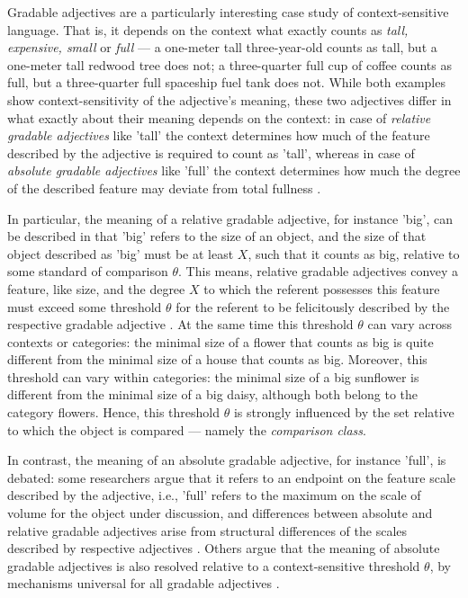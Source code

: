 Gradable adjectives are a particularly interesting case study of context-sensitive language. That is, it depends on the context what exactly counts as \textit{tall, expensive, small} or \textit{full} --- a one-meter tall three-year-old counts as tall, but a one-meter tall redwood tree does not; a three-quarter full cup of coffee counts as full, but a three-quarter full spaceship fuel tank does not. While both examples show context-sensitivity of the adjective's meaning, these two adjectives differ in what exactly about their meaning depends on the context: in case of \textit{relative gradable adjectives} like 'tall' the context determines how much of the feature described by the adjective is required to count as 'tall', whereas in case of \textit{absolute gradable adjectives} like 'full' the context determines how much the degree of the described feature may deviate from total fullness \parencite{Aparicio2016, Kennedy2007, hofherr2010adjectives}.  

In particular, the meaning of a relative gradable adjective, for instance 'big', can be described in that 'big' refers to the size of an object, and the size of that object  described as 'big' must be at least $X$, such that it counts as big, relative to some standard of comparison $\theta$. This means, relative gradable adjectives convey a feature, like size, and the degree $X$ to which the referent possesses this feature must exceed some threshold $\theta$ for the referent to be felicitously described by the respective gradable adjective \parencite[e.g.,][]{Kennedy2007}. At the same time this threshold $\theta$ can vary across contexts or categories: the minimal size of a flower that counts as big is quite different from the minimal size of a house that counts as big. Moreover, this threshold can vary within categories: the minimal size of a big sunflower is different from the minimal size of a big daisy, although both belong to the category flowers. Hence, this threshold $\theta$ is strongly influenced by the set relative to which the object is compared --- namely the \textit{comparison class}.

In contrast, the meaning of an absolute gradable adjective, for instance 'full', is debated: some researchers argue that it refers to an endpoint on the feature scale described by the adjective, i.e., 'full' refers to the maximum on the scale of volume for the object under discussion, and differences between absolute and relative gradable adjectives arise from structural differences of the scales described by respective adjectives \parencite{Kennedy2007, Aparicio2016, Qing2014}. Others argue that the meaning of absolute gradable adjectives is also resolved relative to a context-sensitive threshold $\theta$, by mechanisms universal for all gradable adjectives \parencite{lassiter2017adjectival}.

